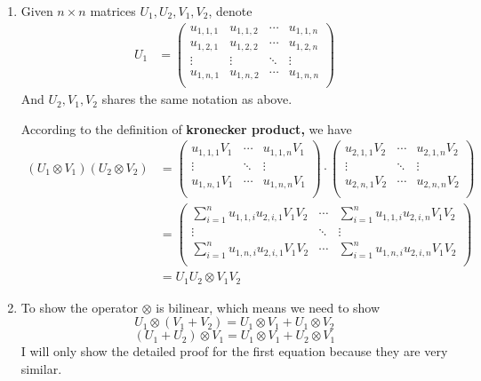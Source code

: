 \documentclass[12pt]{article}
\theoremstyle{definition}
\begin{document}
\begin{enumerate}
\item Given $n \times n$ matrices $U_1,U_2,V_1,V_2$, denote 
\begin{align*}
U_1&=
\begin{pmatrix}
u_{1,1,1} & u_{1,1,2} & \cdots & u_{1,1,n} \\
u_{1,2,1} & u_{1,2,2} & \cdots & u_{1,2,n} \\
\vdots & \vdots & \ddots & \vdots \\
u_{1,n,1} & u_{1,n,2} & \cdots & u_{1,n,n} \\
\end{pmatrix}
\end{align*}
And $U_2,V_1,V_2$ shares the same notation as above. 

According to the definition of \textbf{kronecker product,} we have
\begin{align*}
(U_1\otimes V_1)(U_2\otimes V_2)&=
\begin{pmatrix}
u_{1,1,1}V_1 & \cdots & u_{1,1,n}V_1 \\
\vdots &  \ddots & \vdots \\
u_{1,n,1}V_1 & \cdots & u_{1,n,n}V_1 \\
\end{pmatrix}
\cdot
\begin{pmatrix}
u_{2,1,1}V_2 &\cdots & u_{2,1,n}V_2 \\
\vdots &  \ddots & \vdots \\
u_{2,n,1}V_2  & \cdots & u_{2,n,n}V_2 \\
\end{pmatrix}
\\&=
\begin{pmatrix}
\sum_{i=1}^nu_{1,1,i}u_{2,i,1}V_1V_2 & \cdots & \sum_{i=1}^nu_{1,1,i}u_{2,i,n}V_1V_2 \\
\vdots &  \ddots & \vdots \\
\sum_{i=1}^nu_{1,n,i}u_{2,i,1}V_1V_2 & \cdots & \sum_{i=1}^nu_{1,n,i}u_{2,i,n}V_1V_2 \\
\end{pmatrix}
\\&=U_1U_2 \otimes V_1V_2
\end{align*}
\item To show the operator $\otimes$ is bilinear, which means we need to show 
$$U_1 \otimes (V_1 + V_2) = U_1 \otimes V_1 +  U_1 \otimes V_2 $$
$$(U_1 + U_2)\otimes V_1  = U_1 \otimes V_1 +  U_2 \otimes V_1 $$
I will only show the detailed proof for the first equation because they are very similar.
\begin{align*}

\end{align*}
\end{enumerate}
\end{document}
